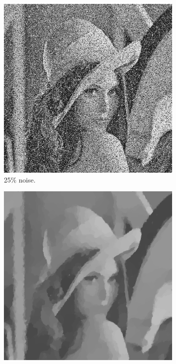 \documentclass[abstracton]{scrreprt}
\begin{document}
\begin{figure}[!ht]
\begin{subfigure}[b]{0.24\textwidth}
                    \includegraphics[width=\textwidth]{img/images/lena_sp_noise.png}
                    \caption{25\% noise.}
                \end{subfigure}
                \begin{subfigure}[b]{0.24\textwidth}
                    \includegraphics[width=\textwidth]{img/denoising/salt_and_pepper_noise/001lena.png}

\end{subfigure}
\end{figure}
\end{document}

